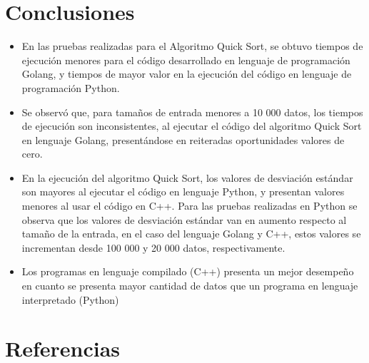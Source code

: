 \documentclass{article}
\begin{document}
   \section{Conclusiones}
   \begin{itemize}
     \item  En las pruebas realizadas para el Algoritmo Quick Sort, se obtuvo tiempos de ejecución menores para el código desarrollado en lenguaje de programación Golang, y tiempos de mayor valor en la ejecución del código en lenguaje de programación Python.
     \item	Se observó que, para tamaños de entrada menores a 10 000 datos, los tiempos de ejecución son inconsistentes, al ejecutar el código del algoritmo Quick Sort en lenguaje Golang, presentándose en reiteradas oportunidades valores de cero.
     \item	En la ejecución del algoritmo Quick Sort, los valores de desviación estándar son mayores al ejecutar el código en lenguaje Python, y presentan valores menores al usar el código en C++. Para las pruebas realizadas en Python se observa que los valores de desviación estándar van en aumento respecto al tamaño de la entrada, en el caso del lenguaje Golang y C++, estos valores se incrementan desde 100 000 y 20 000 datos, respectivamente.
     \item  Los programas en lenguaje compilado (C++) presenta un mejor desempeño en cuanto se presenta mayor cantidad de datos que un programa en lenguaje interpretado (Python)
   \end{itemize}

   \section{Referencias}
\end{document}
